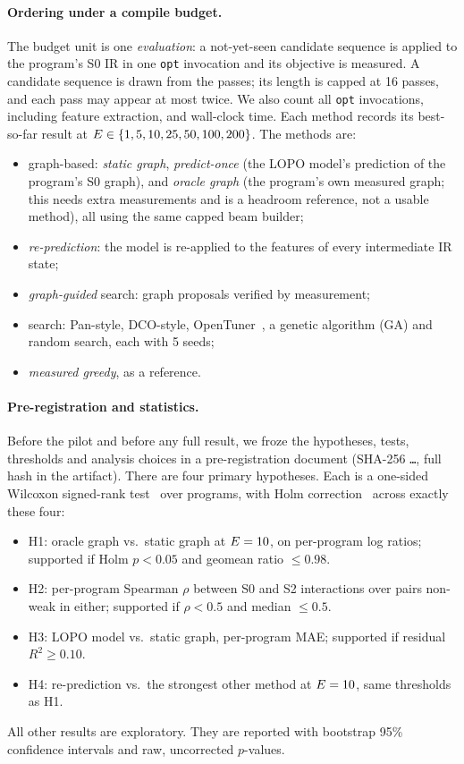 \paragraph{Ordering under a compile budget.}
The budget unit \E is one \emph{evaluation}: a not-yet-seen candidate sequence is applied to the program's S0 IR in one \texttt{opt} invocation and its
objective is measured. A candidate sequence is drawn from the \NPasses{} passes; its length is
capped at 16 passes, and each pass may appear at most twice. We also count all \texttt{opt} invocations, including feature extraction,
and wall-clock time. Each method records its best-so-far result at
$E \in \{1,5,10,25,50,100,200\}$. The methods are:
\begin{itemize}
\item graph-based: \emph{static graph}, \emph{predict-once} (the LOPO model's prediction of the program's S0 graph),
and \emph{oracle graph} (the program's own measured graph; this needs \NPairs{} extra measurements and is a
headroom reference, not a usable method), all using the same capped beam builder;
\item \emph{re-prediction}: the model is re-applied to the features of every intermediate IR state;
\item \emph{graph-guided} search: graph proposals verified by measurement;
\item search: Pan-style, DCO-style, OpenTuner~\cite{opentuner}, a genetic algorithm (GA) and random search, each with 5 seeds;
\item \emph{measured greedy}, as a reference.
\end{itemize}

\paragraph{Pre-registration and statistics.}
Before the pilot and before any full result, we froze the hypotheses, tests, thresholds and
analysis choices in a pre-registration document (SHA-256 \texttt{\PreregShaShort\ldots}, full hash
in the artifact). There are four primary hypotheses. Each is a one-sided Wilcoxon signed-rank test~\cite{wilcoxon1945}
over programs, with Holm correction~\cite{holm1979} across exactly these four:
\begin{itemize}
\item H1: oracle graph vs.\ static graph at $E=10$, on per-program log ratios; supported if Holm $p<0.05$ and geomean ratio $\le 0.98$.
\item H2: per-program Spearman $\rho$ between S0 and S2 interactions over pairs non-weak in either; supported if $\rho<0.5$ and median $\le 0.5$.
\item H3: LOPO model vs.\ static graph, per-program MAE; supported if residual $R^2 \ge 0.10$.
\item H4: re-prediction vs.\ the strongest other method at $E=10$, same thresholds as H1.
\end{itemize}
All other results are exploratory. They are reported with bootstrap 95\% confidence intervals and
raw, uncorrected $p$-values.


